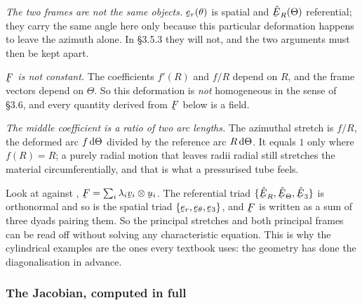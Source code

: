 \begin{remark}\label{rem:warn375}
\emph{The two frames are not the same objects.} $\ber(\theta)$ is spatial
and $\hER(\Theta)$ referential; they carry the same angle here only because
this particular deformation happens to leave the azimuth alone. In
\S3.5.3 they will not, and the two arguments must then be kept apart.

\emph{$\bF$ is not constant.} The coefficients $f'(R)$ and $f/R$ depend on
$R$, and the frame vectors depend on $\Theta$. So this deformation is
\emph{not} homogeneous in the sense of \S3.6, and every quantity derived
from $\bF$ below is a field.

\emph{The middle coefficient is a ratio of two arc lengths.} The azimuthal
stretch is $f/R$, the deformed arc $f\,\mathrm{d}\Theta$ divided by the reference
arc $R\,\mathrm{d}\Theta$. It equals $1$ only where $f(R)=R$; a purely radial
motion that leaves radii radial still stretches the material
circumferentially, and that is what a pressurised tube feels.
\end{remark}

\begin{remark}
\label{rem:radpolar}
Look at  against , $\bF=\sum_{i}\lambda_{i}\bv_{i}\otimes
\bu_{i}$. The referential triad $\{\hER,\hETh,\hbE_{3}\}$ is orthonormal
and so is the spatial triad $\{\ber,\bet,\be_{3}\}$, and $\bF$ is written
as a sum of three dyads pairing them. So the principal stretches and both
principal frames can be read off without solving any characteristic
equation. This is why the cylindrical examples are the ones every textbook
uses: the geometry has done the diagonalisation in advance.
\end{remark}

\subsubsection*{The Jacobian, computed in full}

